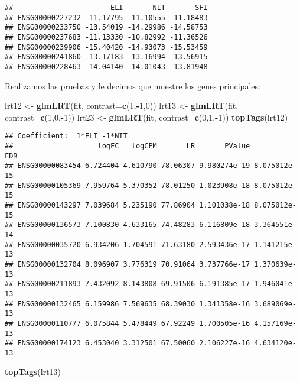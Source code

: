 \documentclass[
]{article}
\newenvironment{Shaded}{\begin{snugshade}}{\end{snugshade}}
\newcommand{\DataTypeTok}[1]{\textcolor[rgb]{0.13,0.29,0.53}{#1}}
\newcommand{\DecValTok}[1]{\textcolor[rgb]{0.00,0.00,0.81}{#1}}
\newcommand{\KeywordTok}[1]{\textcolor[rgb]{0.13,0.29,0.53}{\textbf{#1}}}
\newcommand{\NormalTok}[1]{#1}
\newcommand{\OperatorTok}[1]{\textcolor[rgb]{0.81,0.36,0.00}{\textbf{#1}}}
\newcommand{\StringTok}[1]{\textcolor[rgb]{0.31,0.60,0.02}{#1}}
\begin{document}
\begin{verbatim}
##                       ELI       NIT       SFI
## ENSG00000227232 -11.17795 -11.10555 -11.18483
## ENSG00000233750 -13.54019 -14.29986 -14.58753
## ENSG00000237683 -11.13330 -10.82992 -11.36526
## ENSG00000239906 -15.40420 -14.93073 -15.53459
## ENSG00000241860 -13.17183 -13.16994 -13.56915
## ENSG00000228463 -14.04140 -14.01043 -13.81948
\end{verbatim}

Realizamos las pruebas y le decimos que muestre los genes principales:

\begin{Shaded}
\begin{Highlighting}[]
\NormalTok{lrt12 <-}\StringTok{ }\KeywordTok{glmLRT}\NormalTok{(fit, }\DataTypeTok{contrast=}\KeywordTok{c}\NormalTok{(}\DecValTok{1}\NormalTok{,}\OperatorTok{-}\DecValTok{1}\NormalTok{,}\DecValTok{0}\NormalTok{))}
\NormalTok{lrt13 <-}\StringTok{ }\KeywordTok{glmLRT}\NormalTok{(fit, }\DataTypeTok{contrast=}\KeywordTok{c}\NormalTok{(}\DecValTok{1}\NormalTok{,}\DecValTok{0}\NormalTok{,}\OperatorTok{-}\DecValTok{1}\NormalTok{))}
\NormalTok{lrt23 <-}\StringTok{ }\KeywordTok{glmLRT}\NormalTok{(fit, }\DataTypeTok{contrast=}\KeywordTok{c}\NormalTok{(}\DecValTok{0}\NormalTok{,}\DecValTok{1}\NormalTok{,}\OperatorTok{-}\DecValTok{1}\NormalTok{))}
\KeywordTok{topTags}\NormalTok{(lrt12)}
\end{Highlighting}
\end{Shaded}

\begin{verbatim}
## Coefficient:  1*ELI -1*NIT 
##                    logFC   logCPM       LR       PValue          FDR
## ENSG00000083454 6.724404 4.610790 78.06307 9.980274e-19 8.075012e-15
## ENSG00000105369 7.959764 5.370352 78.01250 1.023908e-18 8.075012e-15
## ENSG00000143297 7.039684 5.235190 77.86904 1.101038e-18 8.075012e-15
## ENSG00000136573 7.100830 4.633165 74.48283 6.116809e-18 3.364551e-14
## ENSG00000035720 6.934206 1.704591 71.63180 2.593436e-17 1.141215e-13
## ENSG00000132704 8.096907 3.776319 70.91064 3.737766e-17 1.370639e-13
## ENSG00000211893 7.432092 8.143808 69.91506 6.191385e-17 1.946041e-13
## ENSG00000132465 6.159986 7.569635 68.39030 1.341358e-16 3.689069e-13
## ENSG00000110777 6.075844 5.478449 67.92249 1.700505e-16 4.157169e-13
## ENSG00000174123 6.453040 3.312501 67.50060 2.106227e-16 4.634120e-13
\end{verbatim}

\begin{Shaded}
\begin{Highlighting}[]
\KeywordTok{topTags}\NormalTok{(lrt13)}
\end{Highlighting}
\end{Shaded}
\end{document}
